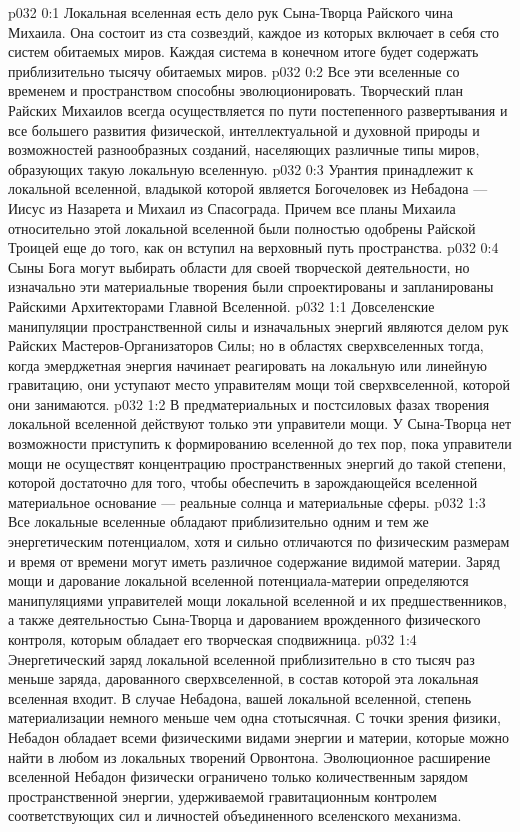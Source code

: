 \author{Могучий Вестник}
\vs p032 0:1 Локальная вселенная есть дело рук Сына\hyp{}Творца Райского чина Михаила. Она состоит из ста созвездий, каждое из которых включает в себя сто систем обитаемых миров. Каждая система в конечном итоге будет содержать приблизительно тысячу обитаемых миров.
\vs p032 0:2 Все эти вселенные со временем и пространством способны эволюционировать. Творческий план Райских Михаилов всегда осуществляется по пути постепенного развертывания и все большего развития физической, интеллектуальной и духовной природы и возможностей разнообразных созданий, населяющих различные типы миров, образующих такую локальную вселенную.
\vs p032 0:3 Урантия принадлежит к локальной вселенной, владыкой которой является Богочеловек из Небадона --- Иисус из Назарета и Михаил из Спасограда. Причем все планы Михаила относительно этой локальной вселенной были полностью одобрены Райской Троицей еще до того, как он вступил на верховный путь пространства.
\vs p032 0:4 Сыны Бога могут выбирать области для своей творческой деятельности, но изначально эти материальные творения были спроектированы и запланированы Райскими Архитекторами Главной Вселенной.
\vs p032 1:1 Довселенские манипуляции пространственной силы и изначальных энергий являются делом рук Райских Мастеров\hyp{}Организаторов Силы; но в областях сверхвселенных тогда, когда эмерджетная энергия начинает реагировать на локальную или линейную гравитацию, они уступают место управителям мощи той сверхвселенной, которой они занимаются.
\vs p032 1:2 В предматериальных и постсиловых фазах творения локальной вселенной действуют только эти управители мощи. У Сына\hyp{}Творца нет возможности приступить к формированию вселенной до тех пор, пока управители мощи не осуществят концентрацию пространственных энергий до такой степени, которой достаточно для того, чтобы обеспечить в зарождающейся вселенной материальное основание --- реальные солнца и материальные сферы.
\vs p032 1:3 \pc Все локальные вселенные обладают приблизительно одним и тем же энергетическим потенциалом, хотя и сильно отличаются по физическим размерам и время от времени могут иметь различное содержание видимой материи. Заряд мощи и дарование локальной вселенной потенциала\hyp{}материи определяются манипуляциями управителей мощи локальной вселенной и их предшественников, а также деятельностью Сына\hyp{}Творца и дарованием врожденного физического контроля, которым обладает его творческая сподвижница.
\vs p032 1:4 Энергетический заряд локальной вселенной приблизительно в сто тысяч раз меньше заряда, дарованного сверхвселенной, в состав которой эта локальная вселенная входит. В случае Небадона, вашей локальной вселенной, степень материализации немного меньше чем одна стотысячная. С точки зрения физики, Небадон обладает всеми физическими видами энергии и материи, которые можно найти в любом из локальных творений Орвонтона. Эволюционное расширение вселенной Небадон физически ограничено только количественным зарядом пространственной энергии, удерживаемой гравитационным контролем соответствующих сил и личностей объединенного вселенского механизма.
